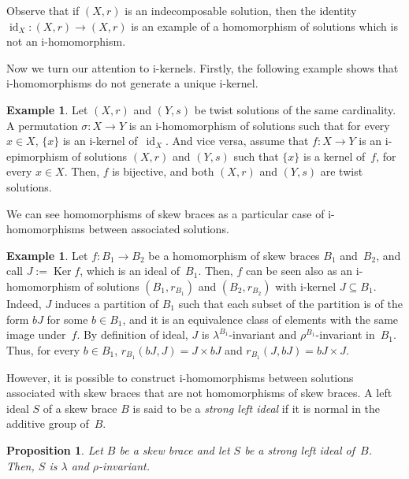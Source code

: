 \documentclass[12pt, a4paper, english]{article}
\newtheorem{proposicio}[teorema]{Proposition}
\theoremstyle{definition}
\newtheorem{exemple}[teorema]{Example}
\theoremstyle{remark}
\DeclareMathOperator{\Ker}{Ker}
\begin{document}
Observe that if $(X,r)$ is an indecomposable solution, then the identity $\operatorname{id}_X\colon (X,r) \rightarrow (X,r)$ is an example of a homomorphism of solutions which is not an i-homomorphism. 

Now we turn our attention to i-kernels. Firstly, the following example shows that i-homomorphisms do not generate a unique i-kernel.

\begin{exemple}
\label{ex:multiples-kernels}
Let $(X,r)$ and $(Y,s)$ be twist solutions of the same cardinality. A permutation $\sigma \colon X \rightarrow Y$ is an i-homomorphism of solutions such that for every $x\in X$, $\{x\}$ is an i-kernel of~$\operatorname{id}_X$. And vice versa, assume that $f\colon X \rightarrow Y$ is an i-epimorphism of solutions $(X,r)$ and $(Y,s)$ such that $\{x\}$ is a kernel of~$f$, for every $x\in X$. Then, $f$ is bijective, and both $(X,r)$ and $(Y,s)$ are twist solutions.
\end{exemple}

We can see homomorphisms of skew braces as a particular case of i-homomorphisms between associated solutions.

\begin{exemple}
\label{ex:homomorfisme-brides}
Let $f \colon B_1 \rightarrow B_2$ be a homomorphism of skew braces $B_1$ and~$B_2$, and call $J:= \Ker f$, which is an ideal of~$B_1$. Then, $f$ can be seen also as an i-homomorphism of solutions $(B_1,r_{B_1})$ and $(B_2, r_{B_2})$ with i-kernel $J\subseteq B_1$. Indeed, $J$ induces a partition of $B_1$ such that each subset of the partition is of the form $bJ$ for some $b\in B_1$, and it is an equivalence class of elements with the same image under~$f$. By definition of ideal, $J$ is $\lambda^{B_1}$-invariant and $\rho^{B_1}$-invariant in~$B_1$. Thus, for every $b\in B_1$, $r_{B_1}(bJ, J) = J \times bJ$ and $r_{B_1}(J, bJ) = bJ \times J$.
\end{exemple}

However, it is possible to construct i-homomorphisms between solutions associated with skew braces that are not homomorphisms of skew braces. A left ideal $S$ of a skew brace $B$ is said to be a \emph{strong left ideal} if it is normal in the additive group of~$B$.

\begin{proposicio}
\label{prop:strong-lr-invariant}
Let $B$ be a skew brace and let $S$ be a strong left ideal of~$B$. Then, $S$ is $\lambda$ and $\rho$-invariant.
\end{proposicio}
\end{document}
